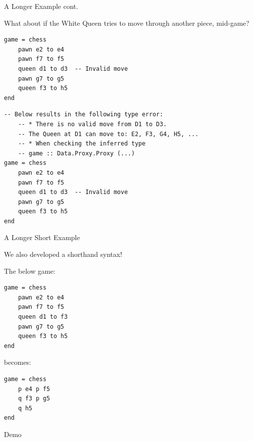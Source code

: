 \documentclass{beamer}
\begin{document}
\begin{frame}[fragile]{A Longer Example cont.}

What about if the White Queen tries to move through another piece, mid-game?

\begin{overprint}

\begin{lstlisting}
game = chess
    pawn e2 to e4
    pawn f7 to f5
    queen d1 to d3  -- Invalid move
    pawn g7 to g5
    queen f3 to h5
end
\end{lstlisting}

\begin{lstlisting}
-- Below results in the following type error:
    -- * There is no valid move from D1 to D3.
    -- The Queen at D1 can move to: E2, F3, G4, H5, ...
    -- * When checking the inferred type
    -- game :: Data.Proxy.Proxy (...)
game = chess
    pawn e2 to e4
    pawn f7 to f5
    queen d1 to d3  -- Invalid move
    pawn g7 to g5
    queen f3 to h5
end
\end{lstlisting}

\end{overprint}

\end{frame}

\begin{frame}[fragile]{A Longer Short Example}

We also developed a shorthand syntax! 

The below game:

\begin{lstlisting}
game = chess
    pawn e2 to e4
    pawn f7 to f5
    queen d1 to f3
    pawn g7 to g5
    queen f3 to h5
end
\end{lstlisting}

becomes:

\begin{lstlisting}
game = chess
    p e4 p f5
    q f3 p g5
    q h5
end
\end{lstlisting}

\end{frame}

\begin{frame}[standout]

Demo
    
\end{frame}
\end{document}
